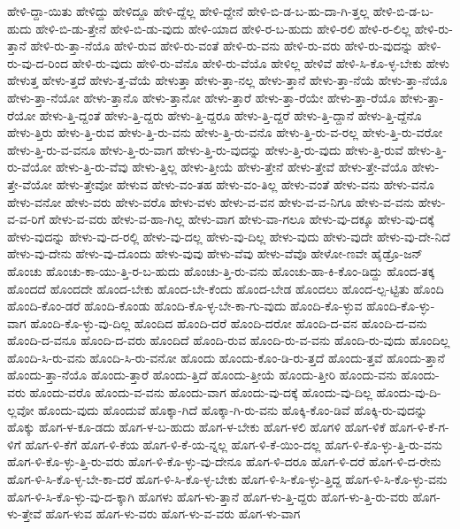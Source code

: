 {ಹೇಳಿ-ದ್ದಾ-ಯಿತು
ಹೇಳಿದ್ದು
ಹೇಳಿದ್ದೂ
ಹೇಳಿ-ದ್ದೆಲ್ಲ
ಹೇಳಿ-ದ್ದೇನೆ
ಹೇಳಿ-ಬಿ-ಡ-ಬ-ಹು-ದಾ-ಗಿ-ತ್ತಲ್ಲ
ಹೇಳಿ-ಬಿ-ಡ-ಬ-ಹುದು
ಹೇಳಿ-ಬಿ-ಡು-ತ್ತೇನೆ
ಹೇಳಿ-ಬಿ-ಡು-ವುದು
ಹೇಳಿ-ಯಾದ
ಹೇಳಿ-ರ-ಬ-ಹುದು
ಹೇಳಿ-ರಲಿ
ಹೇಳಿ-ರ-ಲಿಲ್ಲ
ಹೇಳಿ-ರು-ತ್ತಾನೆ
ಹೇಳಿ-ರು-ತ್ತಾ-ನೆಯೊ
ಹೇಳಿ-ರುವ
ಹೇಳಿ-ರು-ವಂತೆ
ಹೇಳಿ-ರು-ವನು
ಹೇಳಿ-ರು-ವರು
ಹೇಳಿ-ರು-ವುದನ್ನು
ಹೇಳಿ-ರು-ವು-ದ-ರಿಂದ
ಹೇಳಿ-ರು-ವುದು
ಹೇಳಿ-ರು-ವೆನೊ
ಹೇಳಿ-ರು-ವೆಯೊ
ಹೇಳಿಲ್ಲ
ಹೇಳಿವೆ
ಹೇಳಿ-ಸಿ-ಕೊ-ಳ್ಳ-ಬೇಕು
ಹೇಳು
ಹೇಳುತ್ತ
ಹೇಳು-ತ್ತದೆ
ಹೇಳು-ತ್ತ-ವೆಯೆ
ಹೇಳುತ್ತಾ
ಹೇಳು-ತ್ತಾ-ನಲ್ಲ
ಹೇಳು-ತ್ತಾನೆ
ಹೇಳು-ತ್ತಾ-ನೆಯೆ
ಹೇಳು-ತ್ತಾ-ನೆಯೊ
ಹೇಳು-ತ್ತಾ-ನೆಯೋ
ಹೇಳು-ತ್ತಾನೊ
ಹೇಳು-ತ್ತಾನೋ
ಹೇಳು-ತ್ತಾರೆ
ಹೇಳು-ತ್ತಾ-ರೆಯೇ
ಹೇಳು-ತ್ತಾ-ರೆಯೊ
ಹೇಳು-ತ್ತಾ-ರೆಯೋ
ಹೇಳು-ತ್ತಿ-ದ್ದಂತೆ
ಹೇಳು-ತ್ತಿ-ದ್ದರು
ಹೇಳು-ತ್ತಿ-ದ್ದರೂ
ಹೇಳು-ತ್ತಿ-ದ್ದರೆ
ಹೇಳು-ತ್ತಿ-ದ್ದಾನೆ
ಹೇಳು-ತ್ತಿ-ದ್ದೆನೊ
ಹೇಳು-ತ್ತಿರು
ಹೇಳು-ತ್ತಿ-ರುವ
ಹೇಳು-ತ್ತಿ-ರು-ವನು
ಹೇಳು-ತ್ತಿ-ರು-ವನೊ
ಹೇಳು-ತ್ತಿ-ರು-ವ-ರಲ್ಲ
ಹೇಳು-ತ್ತಿ-ರು-ವರೋ
ಹೇಳು-ತ್ತಿ-ರು-ವ-ವನೂ
ಹೇಳು-ತ್ತಿ-ರು-ವಾಗ
ಹೇಳು-ತ್ತಿ-ರು-ವುದನ್ನು
ಹೇಳು-ತ್ತಿ-ರು-ವುದು
ಹೇಳು-ತ್ತಿ-ರುವೆ
ಹೇಳು-ತ್ತಿ-ರು-ವೆಯೋ
ಹೇಳು-ತ್ತಿ-ರು-ವೆವು
ಹೇಳು-ತ್ತಿಲ್ಲ
ಹೇಳು-ತ್ತೀಯೆ
ಹೇಳು-ತ್ತೇನೆ
ಹೇಳು-ತ್ತೇವೆ
ಹೇಳು-ತ್ತೇ-ವೆಯೊ
ಹೇಳು-ತ್ತೇ-ವೆಯೋ
ಹೇಳು-ತ್ತೇವೋ
ಹೇಳುವ
ಹೇಳು-ವಂ-ತಹ
ಹೇಳು-ವಂ-ತಿಲ್ಲ
ಹೇಳು-ವಂತೆ
ಹೇಳು-ವನು
ಹೇಳು-ವನೊ
ಹೇಳು-ವನೋ
ಹೇಳು-ವರು
ಹೇಳು-ವರೊ
ಹೇಳು-ವಳು
ಹೇಳು-ವ-ವನ
ಹೇಳು-ವ-ವ-ನಿಗೂ
ಹೇಳು-ವ-ವನು
ಹೇಳು-ವ-ವ-ರಿಗೆ
ಹೇಳು-ವ-ವರು
ಹೇಳು-ವ-ಹಾ-ಗಿಲ್ಲ
ಹೇಳು-ವಾಗ
ಹೇಳು-ವಾ-ಗಲೂ
ಹೇಳು-ವು-ದಕ್ಕೂ
ಹೇಳು-ವು-ದಕ್ಕೆ
ಹೇಳು-ವುದನ್ನು
ಹೇಳು-ವು-ದ-ರಲ್ಲಿ
ಹೇಳು-ವು-ದಲ್ಲ
ಹೇಳು-ವು-ದಿಲ್ಲ
ಹೇಳು-ವುದು
ಹೇಳು-ವುದೇ
ಹೇಳು-ವು-ದೇ-ನಿದೆ
ಹೇಳು-ವು-ದೇನು
ಹೇಳು-ವು-ದೊಂದು
ಹೇಳು-ವುವು
ಹೇಳು-ವೆವು
ಹೇಳು-ವೆವೊ
ಹೇಳೋ-ಣವೇ
ಹೈಡ್ರೊ-ಜನ್
ಹೊಂಚು
ಹೊಂಚು-ಕಾ-ಯು-ತ್ತಿ-ರ-ಬ-ಹುದು
ಹೊಂಚು-ತ್ತಿ-ರು-ವನು
ಹೊಂಚು-ಹಾ-ಕಿ-ಕೊಂ-ಡಿದ್ದು
ಹೊಂದ-ತಕ್ಕ
ಹೊಂದದೆ
ಹೊಂದದೇ
ಹೊಂದ-ಬೇಕು
ಹೊಂದ-ಬೇ-ಕೆಂದು
ಹೊಂದ-ಬೇಡ
ಹೊಂದಲು
ಹೊಂದ-ಲ್ಪ-ಟ್ಟಿತು
ಹೊಂದಿ
ಹೊಂದಿ-ಕೊಂ-ಡರೆ
ಹೊಂದಿ-ಕೊಂಡು
ಹೊಂದಿ-ಕೊ-ಳ್ಳ-ಬೇ-ಕಾ-ಗು-ವುದು
ಹೊಂದಿ-ಕೊ-ಳ್ಳುವ
ಹೊಂದಿ-ಕೊ-ಳ್ಳು-ವಾಗ
ಹೊಂದಿ-ಕೊ-ಳ್ಳು-ವು-ದಿಲ್ಲ
ಹೊಂದಿದ
ಹೊಂದಿ-ದರೆ
ಹೊಂದಿ-ದರೋ
ಹೊಂದಿ-ದ-ವನ
ಹೊಂದಿ-ದ-ವನು
ಹೊಂದಿ-ದ-ವನೂ
ಹೊಂದಿ-ದ-ವರು
ಹೊಂದಿದೆ
ಹೊಂದಿ-ರುವ
ಹೊಂದಿ-ರು-ವ-ವನು
ಹೊಂದಿ-ರು-ವುದು
ಹೊಂದಿಲ್ಲ
ಹೊಂದಿ-ಸಿ-ರು-ವನು
ಹೊಂದಿ-ಸಿ-ರು-ವನೋ
ಹೊಂದು
ಹೊಂದು-ಕೊಂ-ಡಿ-ರು-ತ್ತದೆ
ಹೊಂದು-ತ್ತವೆ
ಹೊಂದು-ತ್ತಾನೆ
ಹೊಂದು-ತ್ತಾ-ನೆಯೊ
ಹೊಂದು-ತ್ತಾರೆ
ಹೊಂದು-ತ್ತಿದೆ
ಹೊಂದು-ತ್ತೀಯೆ
ಹೊಂದು-ತ್ತೀರಿ
ಹೊಂದು-ವನು
ಹೊಂದು-ವರು
ಹೊಂದು-ವರೊ
ಹೊಂದು-ವ-ವನು
ಹೊಂದು-ವಾಗ
ಹೊಂದು-ವು-ದಕ್ಕೆ
ಹೊಂದು-ವು-ದಿಲ್ಲ
ಹೊಂದು-ವು-ದಿ-ಲ್ಲವೋ
ಹೊಂದು-ವುದು
ಹೊಂದುವೆ
ಹೊಕ್ಕಾ-ಗಿದೆ
ಹೊಕ್ಕಾ-ಗಿ-ರು-ವನು
ಹೊಕ್ಕಿ-ಕೊಂ-ಡಿವೆ
ಹೊಕ್ಕಿ-ರು-ವುದನ್ನು
ಹೊಕ್ಕು
ಹೊಗ-ಳ-ಕೂ-ಡದು
ಹೊಗ-ಳ-ಬ-ಹುದು
ಹೊಗ-ಳ-ಬೇಕು
ಹೊಗ-ಳಲಿ
ಹೊಗಳಿ
ಹೊಗ-ಳಿಕೆ
ಹೊಗ-ಳಿ-ಕೆ-ಗ-ಳಿಗೆ
ಹೊಗ-ಳಿ-ಕೆಗೆ
ಹೊಗ-ಳಿ-ಕೆಯ
ಹೊಗ-ಳಿ-ಕೆ-ಯ-ನ್ನಲ್ಲ
ಹೊಗ-ಳಿ-ಕೆ-ಯಿಂ-ದಲ್ಲ
ಹೊಗ-ಳಿ-ಕೊ-ಳ್ಳು-ತ್ತಿ-ರು-ವನು
ಹೊಗ-ಳಿ-ಕೊ-ಳ್ಳು-ತ್ತಿ-ರು-ವರು
ಹೊಗ-ಳಿ-ಕೊ-ಳ್ಳು-ವು-ದೇನೂ
ಹೊಗ-ಳಿ-ದರೂ
ಹೊಗ-ಳಿ-ದರೆ
ಹೊಗ-ಳಿ-ದ-ರೇನು
ಹೊಗ-ಳಿ-ಸಿ-ಕೊ-ಳ್ಳ-ಬೇ-ಕಾ-ದರೆ
ಹೊಗ-ಳಿ-ಸಿ-ಕೊ-ಳ್ಳ-ಬೇಕು
ಹೊಗ-ಳಿ-ಸಿ-ಕೊ-ಳ್ಳು-ತ್ತಿದ್ದ
ಹೊಗ-ಳಿ-ಸಿ-ಕೊ-ಳ್ಳು-ವನು
ಹೊಗ-ಳಿ-ಸಿ-ಕೊ-ಳ್ಳು-ವು-ದ-ಕ್ಕಾಗಿ
ಹೊಗಳು
ಹೊಗ-ಳು-ತ್ತಾನೆ
ಹೊಗ-ಳು-ತ್ತಿ-ದ್ದರು
ಹೊಗ-ಳು-ತ್ತಿ-ರು-ವರು
ಹೊಗ-ಳು-ತ್ತೇವೆ
ಹೊಗ-ಳುವ
ಹೊಗ-ಳು-ವರು
ಹೊಗ-ಳು-ವ-ವರು
ಹೊಗ-ಳು-ವಾಗ
}
